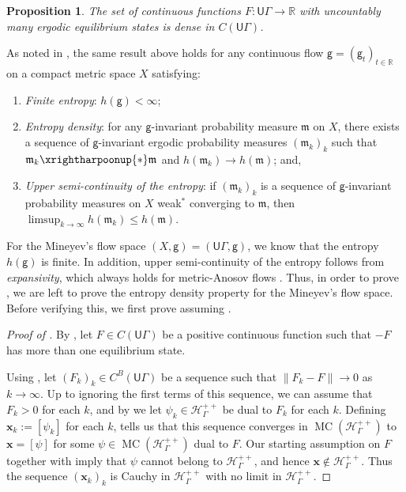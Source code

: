 \documentclass[twoside]{amsart}
\newtheorem{proposition}[theorem]{Proposition}
\theoremstyle{definition}
\numberwithin{equation}{section}
\numberwithin{theorem}{section}
\newcommand{\msf}[1]{\mathsf{#1}}
\newcommand{\R}{\mathbb{R}}
\newcommand{\calH}{\mathcal{H}}
\newcommand{\scrH}{\mathscr{H}}
\newcommand{\frakm}{\mathfrak{m}}
\newcommand{\G}{\Gamma}
\newcommand{\p}{\psi}
\newcommand{\ra}{\rightarrow}
\newcommand{\vx}{\mathbf{x}}
\newcommand{\UG}{\msf{U}\G}
\DeclareMathOperator{\MC}{MC}
\newcommand{\vg}{\msf{g}}
\begin{document}
\begin{proposition}\label{prop:israel}
The set of continuous functions $F:\UG \ra \R$ with uncountably many ergodic equilibrium states is dense in $C(\UG)$.
\end{proposition}

As noted in \cite[Remark~3.9]{iommi-velozo}, the same result above holds for any continuous flow $\vg=(\vg_t)_{t\in \R}$ on a compact metric space $X$ satisfying:
\begin{enumerate}
    \item \emph{Finite entropy}: $h(\vg)<\infty$;
    \item \emph{Entropy density}: for any $\vg$-invariant probability measure $\frakm$ on $X$, there exists a sequence of $\vg$-invariant ergodic probability measures $(\frakm_k)_k$ such that $\frakm_k  \xrightharpoonup{\ast} \frakm$ and $h(\frakm_k)\to h(\frakm)$; and,
    \item \emph{Upper semi-continuity of the entropy}: if $(\frakm_k)_k$ is a sequence of $\vg$-invariant probability measures on $X$ weak$^\ast$ converging to $\frakm$, then $\limsup_{k\to \infty}h(\frakm_k)\leq h(\frakm)$.
\end{enumerate}

For the Mineyev's flow space $(X,\vg)=(\UG,\vg)$, we know that the entropy $h(\vg)$ is finite. In addition, upper semi-continuity of the entropy follows from \emph{expansivity}, which always holds for metric-Anosov flows \cite[Theorem~3.2]{CLT.strong}. Thus, in order to prove , we are left to prove the entropy density property for the Mineyev's flow space. Before verifying this, we first prove  assuming .

\begin{proof}[Proof of ]
By , let $F\in C(\UG)$ be a positive continuous function such that $-F$ has more than one equilibrium state.

Using , let $(F_k)_k\in C^B(\UG)$ be a sequence such that $\|F_k-F\| \to 0$ as $k\to \infty$. Up to ignoring the first terms of this sequence, we can assume that $F_k>0$ for each $k$, and by  we let $\p_k\in \calH_\G^{++}$ be dual to $F_k$ for each $k$. Defining $\vx_k:=[\p_k]$ for each $k$,  tells us that this sequence converges in $\MC(\scrH_\G^{++})$ to $\vx=[\p]$ for some $\p\in \MC(\calH_\G^{++})$ dual to $F$. 
Our starting assumption on $F$ together with  imply that $\p$ cannot belong to $\calH_\G^{++}$, and hence $\vx\notin \scrH_\G^{++}$. Thus the sequence $(\vx_k)_k$ is Cauchy in $\scrH_\G^{++}$ with no limit in $\scrH_\G^{++}$.
\end{proof}
\end{document}
